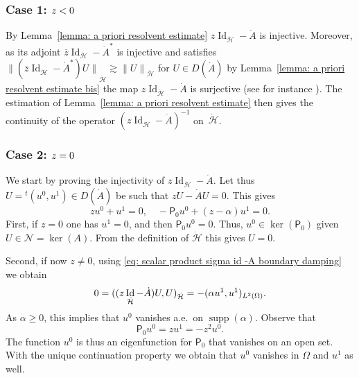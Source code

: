 \documentclass[10pt]{amsart}
\theoremstyle{plain}
\theoremstyle{definition}
\let \Re \relax
\DeclareMathOperator{\Re}{Re}
\newcommand{\ovl}[1]{\overline{#1}}
\newcommand{\inp}[2]{(#1, #2)}
\renewcommand{\H}{{\mathcal H}}
\newcommand{\transp}{\ensuremath{\phantom{}^{t}}}
\newcommand{\Norm}[2]{{\| #1 \|}_{#2}}
\newcommand{\Pell}{\mathsf P_0}
\DeclareMathOperator{\id}{Id}
\DeclareMathOperator{\supp}{supp}
\begin{document}
\subsubsection*{Case 1: ${\Re z <0}$}
By Lemma~\ref{lemma: a priori resolvent estimate}
$z \id_{\dot{\H}} - \dot{A}$ is injective. Moreover, as its adjoint
$\ovl{z} \id_{\dot{\H}} - \dot{A}^*$ is injective and satisfies $\Norm{(\ovl{z} \id_{\dot{\H}} - \dot{A}^*) U}{\dot{\H}} \gtrsim \Norm{U}{\dot{\H}}$ for $U \in
D(\dot{A})$ by Lemma~\ref{lemma: a priori resolvent estimate
bis} the map
$z \id_{\dot{\H}} - \dot{A}$ is surjective (see for instance \cite[Th.\,2.20]{Brezis:11}). The estimation of
Lemma~\ref{lemma: a priori resolvent estimate} then gives the
continuity of the operator $(z \id_{\dot{\H}} - \dot{A})^{-1}$ on~$\dot{\H}$.

\subsubsection*{Case 2: ${\Re z =0}$}
We start by proving the injectivity of $z \id_{\dot{\H}} - \dot{A}$.
Let thus $U =\transp (u^0,u^1) \in D(\dot{A})$ be such that $z U - \dot{A}U=0$.
This gives
\begin{equation}
\label{eq: injectivity sigma - A boundary damping}
z u^0 +u^1 =0, \quad
- \Pell u^0 + (z-\alpha) u^1 =0.
\end{equation}
First, if $z=0$ one has $u^1=0$, and then $\Pell u^0=0$. Thus,
$u^0 \in \ker(\Pell)$ given $U \in \mathcal N = \ker(A)$. From
the definition of $\dot \H$ this gives $U=0$.

Second,
if now $z \neq 0$, using \eqref{eq: scalar product sigma id -A
boundary damping} we obtain
\begin{equation*}
0 = \Re \inp{(z \id_{\dot{\H}} - \dot{A})U}{U}_{\dot{\H}}
= - \inp{\alpha u^1}{u^1}_{L^2 (\Omega)}.
\end{equation*}
As $\alpha\geq 0$, this implies that $u^0$ vanishes a.e.\ on $\supp(\alpha)$.
Observe that
\begin{equation*}
\Pell u^0 = z u^1 = -z^2 u^0.
\end{equation*}
The function $u^0$ is thus an eigenfunction for $\Pell$ that
vanishes on an open set.
With the unique continuation property we obtain that
$u^0$ vanishes in $\Omega$ and $u^1$ as well.
\end{document}
